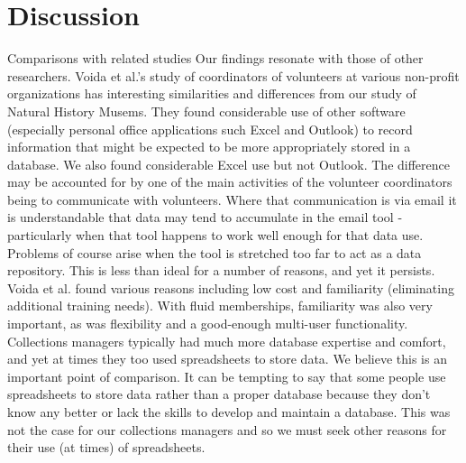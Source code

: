 \section{Discussion}
Comparisons with related studies
Our findings resonate with those of other researchers.
Voida et al.'s study of coordinators of volunteers at various non-profit organizations has interesting similarities and differences from our study of Natural History Musems. They found considerable use of other software (especially personal office applications such Excel and Outlook) to record information that might be expected to be more appropriately stored in a database. We also found considerable Excel use but not Outlook. The difference may be accounted for by one of the main activities of the volunteer coordinators being to communicate with volunteers. Where that communication is via email it is understandable that data may tend to accumulate in the email tool - particularly when that tool happens to work well enough for that data use. Problems of course arise when the tool is stretched too far to act as a data repository. This is less than ideal for a number of reasons, and yet it persists. Voida et al. found various reasons including low cost and familiarity (eliminating additional training needs). With fluid memberships, familiarity was also very important, as was flexibility and a good-enough multi-user functionality. Collections managers typically had much more database expertise and comfort, and yet at times they too used spreadsheets to store data. We believe this is an important point of comparison. It can be tempting to say that some people use spreadsheets to store data rather than a proper database because they don't know any better or lack the skills to develop and maintain a database. This was not the case for our collections managers and so we must seek other reasons for their use (at times) of spreadsheets.

